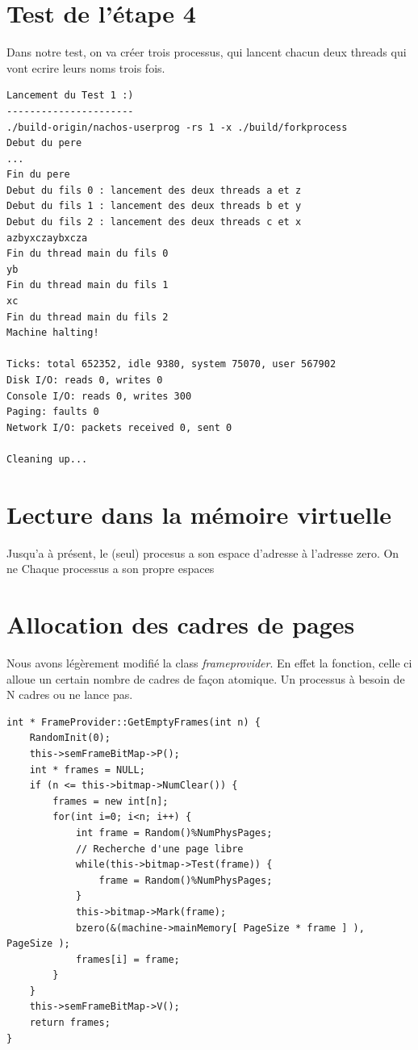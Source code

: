 \documentclass[a4paper,10pt]{article}
\begin{document}
\section{Test de l'étape 4}

Dans notre test, on va créer trois processus, qui lancent chacun deux threads
qui vont ecrire leurs noms trois fois.

\begin{lstlisting}
Lancement du Test 1 :)
----------------------
./build-origin/nachos-userprog -rs 1 -x ./build/forkprocess
Debut du pere
...
Fin du pere
Debut du fils 0 : lancement des deux threads a et z
Debut du fils 1 : lancement des deux threads b et y
Debut du fils 2 : lancement des deux threads c et x
azbyxczaybxcza
Fin du thread main du fils 0
yb
Fin du thread main du fils 1
xc
Fin du thread main du fils 2
Machine halting!

Ticks: total 652352, idle 9380, system 75070, user 567902
Disk I/O: reads 0, writes 0
Console I/O: reads 0, writes 300
Paging: faults 0
Network I/O: packets received 0, sent 0

Cleaning up...
\end{lstlisting}

\section{Lecture dans la mémoire virtuelle}

Jusqu'a à présent, le (seul) procesus a son espace d'adresse à l'adresse zero. On ne
Chaque processus a son propre espaces


\section{Allocation des cadres de pages}

Nous avons légèrement modifié la class \textit{frameprovider}. En effet
la fonction, celle ci alloue un certain nombre de cadres de façon atomique. Un
processus à besoin de N cadres ou ne lance pas.

\begin{lstlisting}
int * FrameProvider::GetEmptyFrames(int n) {
    RandomInit(0);
    this->semFrameBitMap->P();
    int * frames = NULL;
    if (n <= this->bitmap->NumClear()) {
        frames = new int[n];
        for(int i=0; i<n; i++) {
            int frame = Random()%NumPhysPages;
            // Recherche d'une page libre
            while(this->bitmap->Test(frame)) {
                frame = Random()%NumPhysPages;
            }
            this->bitmap->Mark(frame);
            bzero(&(machine->mainMemory[ PageSize * frame ] ), PageSize );
            frames[i] = frame;
        }
    }
    this->semFrameBitMap->V();
    return frames;
}
\end{lstlisting}
\end{document}
